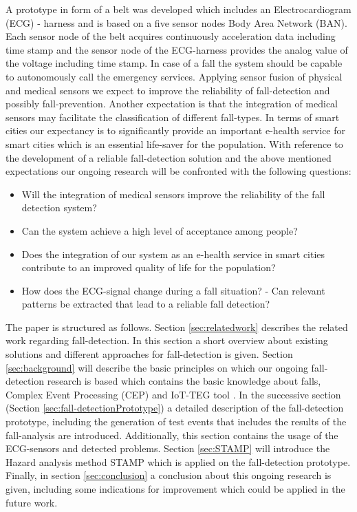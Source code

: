 \documentclass[review]{elsarticle}
\begin{document}
A prototype in form of a belt was developed which includes an Electrocardiogram (ECG) - harness and is based on a five sensor nodes Body Area Network (BAN). Each sensor node of the belt acquires continuously acceleration data including time stamp and the sensor node of the ECG-harness provides the analog value of the voltage including time stamp. In case of a fall the system should be capable to autonomously call the emergency services. Applying sensor fusion of physical and medical sensors we expect to improve the reliability of fall-detection and possibly fall-prevention. Another expectation is that the integration of medical sensors may facilitate the classification of different fall-types. In terms of smart cities our expectancy is to significantly provide an important e-health service for smart cities which is an essential life-saver for the population.
With reference to the development of a reliable fall-detection solution and the above mentioned expectations our ongoing research will be confronted with the following questions:
\begin{itemize}
	\item Will the integration of medical sensors improve the reliability of the fall detection system?
	\item Can the system achieve a high level of acceptance among people?
	\item Does the integration of our system as an e-health service in smart cities contribute to an improved quality of life for the population?
	\item How does the ECG-signal change during a fall situation? - Can relevant patterns be extracted that lead to a reliable fall detection?
	
\end{itemize}

The paper is structured as follows. Section \ref{sec:relatedwork} describes the related work regarding fall-detection. In this section a short overview about existing solutions and different approaches for fall-detection is given. Section \ref{sec:background} will describe the basic principles on which our ongoing fall-detection research is based which contains the basic knowledge about falls, Complex Event Processing (CEP) \cite{Esper:2016} and IoT-TEG tool \cite{Gutierrez2017, TesisGutierrez2017}. In the successive section (Section \ref{sec:fall-detectionPrototype}) a detailed description of the fall-detection prototype, including the generation of test events that includes the results of the fall-analysis are introduced. Additionally, this section contains the usage of the ECG-sensors and detected problems. Section \ref{sec:STAMP} will introduce the Hazard analysis method STAMP \cite{leveson2011engineering} which is applied on the fall-detection prototype.
Finally, in section \ref{sec:conclusion} a conclusion about this ongoing research is given, including some indications for improvement which could be applied in the future work.
\end{document}
